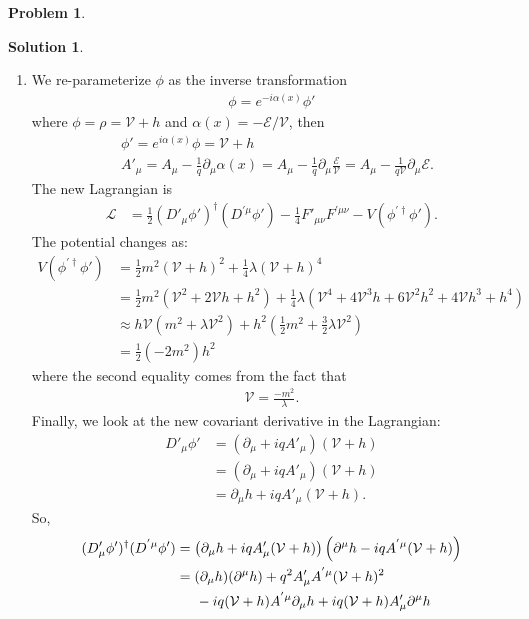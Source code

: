 \documentclass[a4paper,11pt]{article}
\numberwithin{equation}{section}
\theoremstyle{definition}
\newtheorem{prob}{Problem}[section]
\newtheorem{sln}{Solution}[section]
\newcommand{\p}{\partial}
\newcommand{\lag}{\mathcal{L}}
\newcommand{\E}{\mathcal{E}}
\newcommand{\V}{\mathcal{V}}
\begin{document}
\begin{prob}
\begin{sln}
\begin{enumerate}
				
				\item We re-parameterize $\phi$ as the inverse transformation
				\begin{align}
				\phi = e^{-i\alpha(x)}\phi'
				\end{align}
				where $\phi = \rho = \V + h$  and $\alpha(x) = -\E/\V$, then
				\begin{align}
				&\phi' = e^{i\alpha(x)}\phi = \V + h\\
				&A'_\mu = A_\mu - \frac{1}{q}\p_\mu\alpha(x) = A_\mu - \frac{1}{q}\p_\mu \frac{\E}{\V} = A_\mu - \frac{1}{q\V}\p_\mu\E.
				\end{align}
				The new Lagrangian is
				\begin{align}
				\lag &= \frac{1}{2}(D'_\mu\phi')^\dagger(D^{'\mu}\phi') - \frac{1}{4}F'_{\mu\nu}F^{'\mu\nu} - V(\phi^{'\dagger}\phi').
				\end{align}
				The potential changes as:
				\begin{align}
				V(\phi^{'\dagger}\phi') &= \frac{1}{2}m^2(\V+h)^2 + \frac{1}{4}\lambda (\V+h)^4\nonumber\\
				&= \frac{1}{2}m^2(\V^2 + 2\V h + h^2) + \frac{1}{4}\lambda(\V^4 + 4 \V^3 h + 6\V^2 h^2 + 4\V h^3 + h^4)\nonumber\\
				&\approx  h\V\left(m^2 + \lambda\V^2\right) + h^2\left(\frac{1}{2}m^2 + \frac{3}{2}\lambda\V^2\right)\nonumber\\
				&= \frac{1}{2}(-2m^2)h^2
				\end{align}
				where the second equality comes from the fact that 
				\begin{align}
				\V = \frac{-m^2}{\lambda}.
				\end{align}
				Finally, we look at the new covariant derivative in the Lagrangian:
				\begin{align}
				D'_\mu\phi'
				&= (\p_\mu + iq A'_\mu)(\V+h)\nonumber\\
				&= (\p_\mu + iq A'_\mu)(\V+h)\nonumber\\
				&= \p_\mu h + iq A'_\mu (\V+h).
				\end{align}
				So,
				\begin{align}
				(D'_\mu\phi')^\dagger(D^{'\mu}\phi')
				&= \left(\p_\mu h + iq A'_\mu (\V+h)\right)\left(\p^\mu h - iq A^{'\mu} (\V+h)\right)\nonumber\\
				&= (\p_\mu h)(\p^\mu h) + q^2 A'_\mu A^{'\mu}(\V+h)^2\nonumber\\
				&\hspace{0.5cm} -iq(\V+h) A^{'\mu} \p_\mu h + iq(\V+h)A'_\mu\p^\mu h\nonumber\\

\end{align}
\end{enumerate}
\end{sln}
\end{prob}
\end{document}
